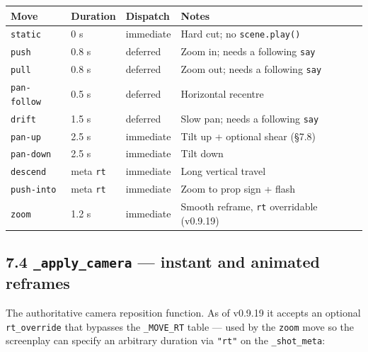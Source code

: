 \documentclass[
  12pt,
  letterpaper,
]{book}
\begin{document}
\begin{longtable}[]{@{}llll@{}}
\toprule\noalign{}
Move & Duration & Dispatch & Notes \\
\midrule\noalign{}
\endhead
\bottomrule\noalign{}
\endlastfoot
\texttt{static}     & 0 s    & immediate & Hard cut; no \texttt{scene.play()} \\
\texttt{push}       & 0.8 s  & deferred  & Zoom in; needs a following \texttt{say} \\
\texttt{pull}       & 0.8 s  & deferred  & Zoom out; needs a following \texttt{say} \\
\texttt{pan-follow} & 0.5 s  & deferred  & Horizontal recentre \\
\texttt{drift}      & 1.5 s  & deferred  & Slow pan; needs a following \texttt{say} \\
\texttt{pan-up}     & 2.5 s  & immediate & Tilt up + optional shear (§7.8) \\
\texttt{pan-down}   & 2.5 s  & immediate & Tilt down \\
\texttt{descend}    & meta \texttt{rt} & immediate & Long vertical travel \\
\texttt{push-into}  & meta \texttt{rt} & immediate & Zoom to prop sign + flash \\
\texttt{zoom}       & 1.2 s  & immediate & Smooth reframe, \texttt{rt} overridable (v0.9.19) \\
\end{longtable}

\subsection{\texorpdfstring{7.4 \texttt{\_apply\_camera} --- instant and
animated
reframes}{7.4 \_apply\_camera --- instant and animated reframes}}\label{apply_camera-instant-and-animated-reframes}

The authoritative camera reposition function. As of v0.9.19 it accepts
an optional \texttt{rt\_override} that bypasses the \texttt{\_MOVE\_RT}
table --- used by the \texttt{zoom} move so the screenplay can specify
an arbitrary duration via \texttt{"rt"} on the \texttt{\_shot\_meta}:
\end{document}
